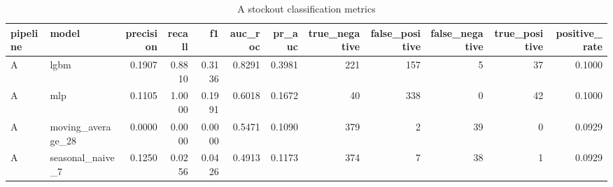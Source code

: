 \begin{table}
\caption{A stockout classification metrics}
\label{tab:classification-A}
\begin{tabular}{llrrrrrrrrrr}
\toprule
pipeline & model & precision & recall & f1 & auc\_roc & pr\_auc & true\_negative & false\_positive & false\_negative & true\_positive & positive\_rate \\
\midrule
A & lgbm & 0.1907 & 0.8810 & 0.3136 & 0.8291 & 0.3981 & 221 & 157 & 5 & 37 & 0.1000 \\
A & mlp & 0.1105 & 1.0000 & 0.1991 & 0.6018 & 0.1672 & 40 & 338 & 0 & 42 & 0.1000 \\
A & moving\_average\_28 & 0.0000 & 0.0000 & 0.0000 & 0.5471 & 0.1090 & 379 & 2 & 39 & 0 & 0.0929 \\
A & seasonal\_naive\_7 & 0.1250 & 0.0256 & 0.0426 & 0.4913 & 0.1173 & 374 & 7 & 38 & 1 & 0.0929 \\
\bottomrule
\end{tabular}
\end{table}
